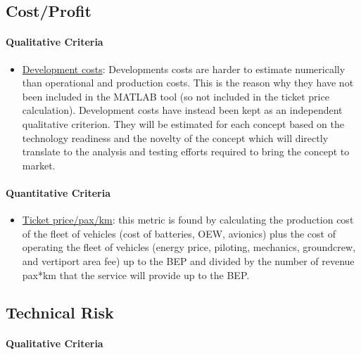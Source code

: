 \subsection{Cost/Profit}

\paragraph{Qualitative Criteria}


\begin{itemize}
    \item \underline{Development costs}: Developments costs are harder to estimate numerically than operational and production costs. This is the reason why they have not been included in the MATLAB tool (so not included in the ticket price calculation). Development costs have instead been kept as an independent qualitative criterion. They will be estimated for each concept based on the technology readiness and the novelty of the concept which will directly translate to the analysis and testing efforts required to bring the concept to market.
\end{itemize}

\paragraph{Quantitative Criteria}



\begin{itemize}
   \item \underline{Ticket price/pax/km}: this metric is found by calculating the production cost of the fleet of vehicles (cost of batteries, OEW, avionics) plus the cost of operating the fleet of vehicles (energy price, piloting, mechanics, groundcrew, and vertiport area fee) up to the BEP and divided by the number of revenue pax*km that the service will provide up to the BEP. 
\end{itemize}

\subsection{Technical Risk}

\paragraph{Qualitative Criteria}

